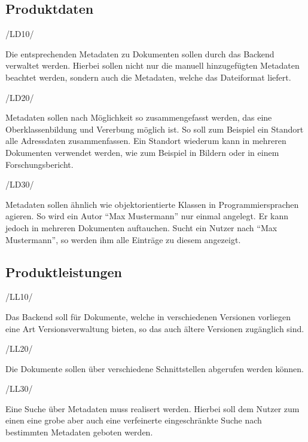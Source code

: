 \subsection{Produktdaten}
\begin{minipage}{3cm}
/LD10/
\end{minipage}
\begin{minipage}{13cm}
Die entsprechenden Metadaten zu Dokumenten sollen durch das Backend verwaltet werden. Hierbei sollen nicht nur die manuell hinzugef\"ugten Metadaten beachtet werden, sondern auch die Metadaten, welche das Dateiformat liefert.\\
\end{minipage}
\begin{minipage}{3cm}
/LD20/
\end{minipage}
\begin{minipage}{13cm}
Metadaten sollen nach M\"oglichkeit so zusammengefasst werden, das eine Oberklassenbildung und Vererbung m\"oglich ist. So soll zum Beispiel ein Standort alle Adressdaten zusammenfassen. Ein Standort wiederum kann in mehreren Dokumenten verwendet werden, wie zum Beispiel in Bildern oder in einem Forschungsbericht.\\
\end{minipage}
\begin{minipage}{3cm}
/LD30/
\end{minipage}
\begin{minipage}{13cm}
Metadaten sollen \"ahnlich wie objektorientierte Klassen in Programmiersprachen agieren. So wird ein Autor "`Max Mustermann"' nur einmal angelegt. Er kann jedoch in mehreren Dokumenten auftauchen. Sucht ein Nutzer nach "`Max Mustermann"', so werden ihm alle Eintr\"age zu diesem angezeigt.\\
\end{minipage}


\subsection{Produktleistungen}
\begin{minipage}{3cm}
/LL10/
\end{minipage}
\begin{minipage}{13cm}
Das Backend soll f\"ur Dokumente, welche in verschiedenen Versionen vorliegen eine Art Versionsverwaltung bieten, so das auch \"altere Versionen zug\"anglich sind.\\
\end{minipage}
\begin{minipage}{3cm}
/LL20/
\end{minipage}
\begin{minipage}{13cm}
Die Dokumente sollen \"uber verschiedene Schnittstellen abgerufen werden k\"onnen.\\
\end{minipage}
\begin{minipage}{3cm}
/LL30/
\end{minipage}
\begin{minipage}{13cm}
Eine Suche \"uber Metadaten muss realisert werden. Hierbei soll dem Nutzer zum einen eine grobe aber auch eine verfeinerte eingeschr\"ankte Suche nach bestimmten Metadaten geboten werden.\\
\end{minipage}